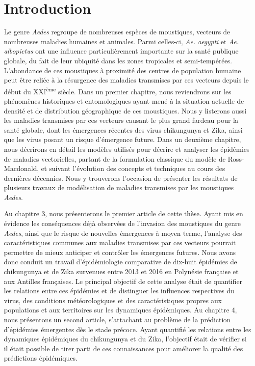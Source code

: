 \chapter*{Introduction}

Le genre {\em Aedes} regroupe de nombreuses espèces de moustiques, vecteurs de nombreuses maladies humaines et animales. 
Parmi celles-ci, {\em Ae. aegypti} et {\em Ae. albopictus} ont une influence particulièrement importante sur la santé publique globale, du fait de leur ubiquité dans les zones tropicales et semi-tempérées.
L'abondance de ces moustiques à proximité des centres de population humaine peut être reliée à la résurgence des maladies transmises par ces vecteurs depuis le début du XXI\textsuperscript{ème} siècle.
Dans un premier chapitre, nous reviendrons sur les phénomènes historiques et entomologiques ayant mené à la situation actuelle de densité et de distribution géographique de ces moustiques.
Nous y listerons aussi les maladies transmises par ces vecteurs causant le plus grand fardeau pour la santé globale, dont les émergences récentes des virus chikungunya et Zika, ainsi que les virus posant un risque d'émergence future.
Dans un deuxième chapitre, nous décrirons en détail les modèles utilisés pour décrire et analyser les épidémies de maladies vectorielles, partant de la formulation classique du modèle de Ross-Macdonald, et suivant l'évolution des concepts et techniques au cours des dernières décennies. 
Nous y trouverons l'occasion de présenter les résultats de plusieurs travaux de modélisation de maladies transmises par les moustiques {\em Aedes}.

Au chapitre 3, nous présenterons le premier article de cette thèse.
Ayant mis en évidence les conséquences déjà observées de l'invasion des moustiques du genre {\em Aedes}, ainsi que le risque de nouvelles émergences à moyen terme, l'analyse des caractéristiques communes aux maladies transmises par ces vecteurs pourrait permettre de mieux anticiper et contrôler les émergences futures.
Nous avons donc conduit un travail d'épidémiologie comparative de dix-huit épidémies de chikungunya et de Zika survenues entre 2013 et 2016 en Polynésie française et aux Antilles françaises.
Le principal objectif de cette analyse était de quantifier les relations entre ces épidémies et de distinguer les influences respectives du virus, des conditions météorologiques et des caractéristiques propres aux populations et aux territoires sur les dynamiques épidémiques.
Au chapitre 4, nous présentons un second article, s'attachant au problème de la prédiction d'épidémies émergentes dès le stade précoce.
Ayant quantifié les relations entre les dynamiques épidémiques du chikungunya et du Zika, l'objectif était de vérifier si il était possible de tirer parti de ces connaissances pour améliorer la qualité des prédictions épidémiques.

